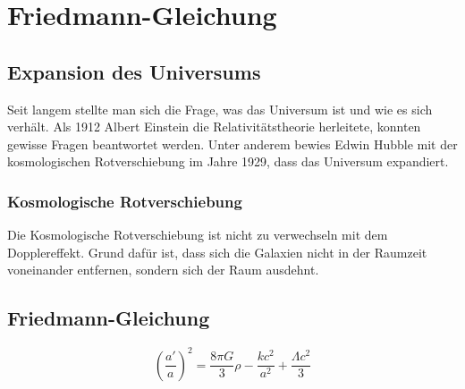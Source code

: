 \chapter{Friedmann-Gleichung\label{chapter:thema}}
\begin{refsection}
\printbibliography[heading=subbibliography]
\section{Expansion des Universums}
Seit langem stellte man sich die Frage, was das Universum ist und wie es sich verh\"{a}lt. Als 1912 Albert Einstein die Relativit\"{a}tstheorie herleitete, konnten gewisse Fragen beantwortet werden. Unter anderem bewies Edwin Hubble mit der kosmologischen Rotverschiebung im Jahre 1929, dass das Universum expandiert.
\subsection{Kosmologische Rotverschiebung}
Die Kosmologische Rotverschiebung ist nicht zu verwechseln mit dem Dopplereffekt. Grund daf\"{u}r ist, dass sich die Galaxien nicht in der Raumzeit voneinander entfernen, sondern sich der Raum ausdehnt. 
\section{Friedmann-Gleichung}
\begin{equation}
\left(\frac{a'}{a}\right) ^ 2 = \frac{8 \pi G}{3} \rho - \frac{k c^2}{a^2} + \frac{\Lambda c^2}{3}
\end{equation}
\end{refsection}

